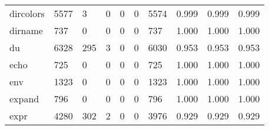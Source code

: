 \begin{longtable}{lp{2.0cm}p{2.0cm}p{2.0cm}p{2.0cm}p{2.0cm}p{2.0cm}p{2.0cm}p{2.0cm}p{2.0cm}}
dircolors &                   5577 &                                  3 &                                 0 &                                0 &                                 0 &                            5574 &                                0.999 &                                  0.999 &                                0.999 \\
dirname   &                    737 &                                  0 &                                 0 &                                0 &                                 0 &                             737 &                                1.000 &                                  1.000 &                                1.000 \\
du        &                   6328 &                                295 &                                 3 &                                0 &                                 0 &                            6030 &                                0.953 &                                  0.953 &                                0.953 \\
echo      &                    725 &                                  0 &                                 0 &                                0 &                                 0 &                             725 &                                1.000 &                                  1.000 &                                1.000 \\
env       &                   1323 &                                  0 &                                 0 &                                0 &                                 0 &                            1323 &                                1.000 &                                  1.000 &                                1.000 \\
expand    &                    796 &                                  0 &                                 0 &                                0 &                                 0 &                             796 &                                1.000 &                                  1.000 &                                1.000 \\
expr      &                   4280 &                                302 &                                 2 &                                0 &                                 0 &                            3976 &                                0.929 &                                  0.929 &                                0.929 \\

\end{longtable}
